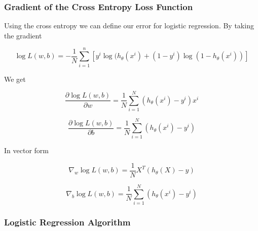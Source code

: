 \subsubsection*{Gradient of the Cross Entropy Loss Function}

Using the cross entropy we can define our error for logistic regression. By taking the gradient

\[
   \log L(w,b) = - \frac{1}{N} \sum_{i = 1}^{n} [y^i \log(h_\theta (x^i) + (1 - y^i) \log(1 - h_\theta (x^i))]
\]

We get 

\[
    \frac{\partial \log L(w,b)}{\partial w} = \frac{1}{N} \sum_{i=1}^{N} (h_\theta(x^i) - y^i) x^i
\]

\[
    \frac{\partial \log L(w,b)}{\partial b} = \frac{1}{N} \sum_{i=1}^{N} (h_\theta(x^i) - y^i)  
\]

In vector form

\[
    \nabla_w \log L(w,b) = \frac{1}{N} X^T (h_\theta(X) - y)
\]

\[
    \nabla_b \log L(w,b) = \frac{1}{N} \sum_{i=1}^{N} (h_\theta(x^i) - y^i)
\]

\subsubsection{Logistic Regression Algorithm}

